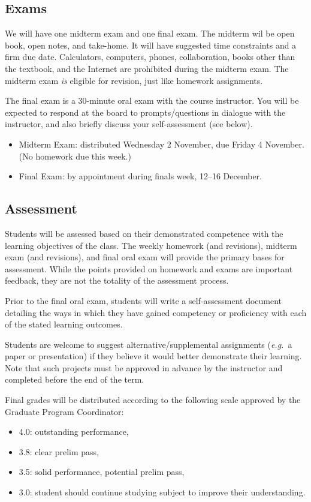 \documentclass[11pt,twoside]{amsart}
\begin{document}
\subsection*{Exams}
We will have one midterm exam and one final exam. The midterm wil be open book, open notes, and take-home. It will have suggested time constraints and a firm due date. Calculators, computers, phones, collaboration, books other than the textbook, and the Internet are prohibited during the midterm exam. The midterm exam \emph{is} eligible for revision, just like homework assignments.

The final exam is a 30-minute oral exam with the course instructor. You will be expected to respond at the board to prompts/questions in dialogue with the instructor, and also briefly discuss your self-assessment (see below).

\begin{itemize}
\item Midterm Exam: distributed Wednesday 2 November, due Friday 4 November. (No homework due this week.)
\item Final Exam: by appointment during finals week, 12--16 December.
\end{itemize}

\subsection*{Assessment}%
Students will be assessed based on their demonstrated competence with the learning objectives of the class. The weekly homework (and revisions), midterm exam (and revisions), and final oral exam will provide the primary bases for assessment. While the points provided on homework and exams are important feedback, they are not the totality of the assessment process.

Prior to the final oral exam, students will write a self-assessment document detailing the ways in which they have gained competency or proficiency with each of the stated learning outcomes.

Students are welcome to suggest alternative/supplemental assignments (\emph{e.g.}~a paper or presentation) if they believe it would better demonstrate their learning. Note that such projects must be approved in advance by the instructor and completed before the end of the term.

Final grades will be distributed according to the following scale approved by the Graduate Program Coordinator:
\begin{itemize}
\item 4.0: outstanding performance,
\item 3.8: clear prelim pass,
\item 3.5: solid performance, potential prelim pass,
\item 3.0: student should continue studying subject to improve their understanding.
\end{itemize}
\end{document}
